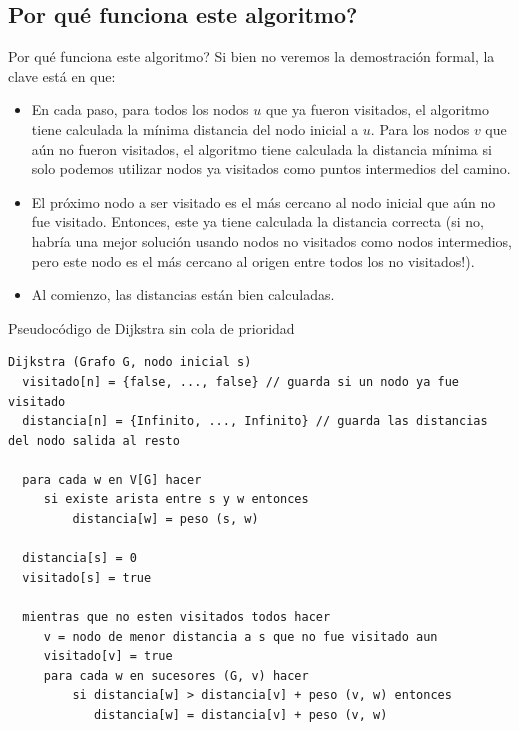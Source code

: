 \documentclass[compress]{beamer}
\begin{document}
\subsection{\textquestiondown Por qué funciona este algoritmo?}
\begin{frame}{\textquestiondown Por qué funciona este algoritmo?}
Si bien no veremos la demostración formal, la clave está en que:

\begin{itemize}
\item En cada paso, para todos los nodos $u$ que ya fueron visitados,
el algoritmo tiene calculada la mínima distancia del nodo inicial a $u$.
Para los nodos $v$ que aún no fueron visitados, el algoritmo tiene calculada
la distancia mínima si solo podemos utilizar nodos ya visitados como puntos
intermedios del camino.
\item El próximo nodo a ser visitado es el más cercano al nodo inicial
que aún no fue visitado. Entonces, este ya tiene calculada la distancia
correcta (si no, habría una mejor solución usando nodos no visitados como
nodos intermedios, pero este nodo es el más cercano al origen entre todos los
no visitados!).
\item Al comienzo, las distancias están bien calculadas.
\end{itemize}

\end{frame}

\begin{frame}[fragile]{Pseudocódigo de Dijkstra sin cola de prioridad}
\begin{lstlisting}
Dijkstra (Grafo G, nodo inicial s)
  visitado[n] = {false, ..., false} // guarda si un nodo ya fue visitado
  distancia[n] = {Infinito, ..., Infinito} // guarda las distancias del nodo salida al resto
  
  para cada w en V[G] hacer
     si existe arista entre s y w entonces
         distancia[w] = peso (s, w)

  distancia[s] = 0
  visitado[s] = true
  
  mientras que no esten visitados todos hacer 
     v = nodo de menor distancia a s que no fue visitado aun
     visitado[v] = true
     para cada w en sucesores (G, v) hacer
         si distancia[w] > distancia[v] + peso (v, w) entonces
            distancia[w] = distancia[v] + peso (v, w)

\end{lstlisting}
\end{frame}
\end{document}
